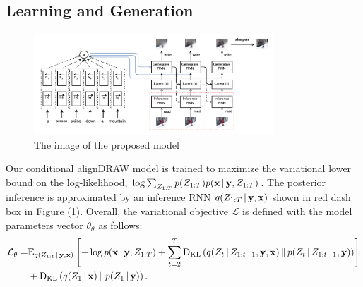 \documentclass{article} %
\newcommand{\given}{\,|\,}
\newcommand{\expectation}{\mathbb{E}}
\newcommand{\kldiv}{\mathrm{D}_{\rm KL}}
\newcommand{\klBars}{\,\|\,}
\newcommand{\Lat}{Z}
\newcommand{\icaption}{{\bf{y}}}
\newcommand{\oimage}{{\bf{x}}}
\newcommand{\post}{q}
\newcommand{\prior}{p}
\newcommand{\loss}{\mathcal{L}}
\begin{document}
\vspace{-0.2cm}
\subsection{Learning and Generation}

\begin{figure}[!h]
\vspace{-0.3in}
\captionsetup[subfigure]{labelformat=empty}
\begin{center}
\includegraphics[width=0.8\textwidth]{figures/alignDraw-cropped.pdf}\quad
%
\end{center}
\vspace{-0.2in}
\caption{The image of the proposed model}
\label{fig:figmodel}
\vspace{-0.2in}
\end{figure}

Our conditional alignDRAW model is trained to maximize the variational lower bound on the log-likelihood, $\log \sum_{\Lat_{1:T}} \prior(\Lat_{1:T})p(\oimage\given\icaption, \Lat_{1:T})$. The posterior inference is approximated by an inference RNN $\post(\Lat_{1:T}\given\icaption,\oimage)$ shown in red dash box in Figure (\ref{fig:figmodel}).   
Overall, the variational objective $\loss$ is defined with the model parameters vector $\theta_\theta$ as follows:
\begin{align}
\vspace{-0.1in}
\small
\loss_\theta =  &\expectation_{\post(\Lat_{1:t}\given\icaption,\oimage)}\left[ - \log p(\oimage\given\icaption,\Lat_{1:T}) + \sum_{t=2}^T\kldiv\left(\post(\Lat_t\given\Lat_{1:t-1},\icaption,\oimage)\klBars\prior(\Lat_t\given\Lat_{1:t-1},\icaption)\right) \right] \nonumber \\& + \kldiv\left(\post(\Lat_1\given\oimage)\klBars\prior(\Lat_1\given\icaption)\right).
\end{align}
\end{document}
